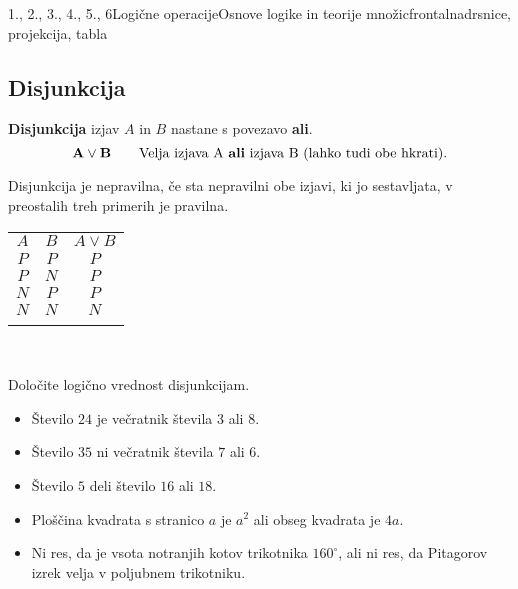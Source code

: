\begin{priprava}{1., 2., 3., 4., 5., 6}{}{Logične operacije}{Osnove logike in teorije množic}{frontalna}{drsnice, projekcija, tabla}
  ~


   \subsection{Disjunkcija}
      \textbf{Disjunkcija} izjav $A$ in $B$ nastane s povezavo \textbf{ali}.
      $$ \mathbf{A\lor B} \quad \quad \textmd{Velja izjava A \textbf{ali} izjava B 
      (lahko tudi obe hkrati).}$$
   
            
              Disjunkcija je nepravilna, če sta nepravilni obe izjavi, ki jo sestavljata,
              v preostalih treh primerih je pravilna.
           

          \begin{table}[H]
              \centering
              \begin{tabular}{||c|c|c||} 
              \hhline{|t:===:t|}
              \rowcolor[rgb]{0.843,0.718,0.718} $A$ & $B$ & $A\lor B$  \\ 
              \hhline{|:===:|}
              $P$ & $P$ & $P$                         \\ 
              \hline
              $P$ & $N$ & $P$                         \\ 
              \hline
              $N$ & $P$ & $P$                         \\ 
              \hline
              $N$ & $N$ & $N$                         \\
              \hhline{|b:===:b|}
              \end{tabular}
          \end{table}



~


   \begin{naloga}
      Določite logično vrednost disjunkcijam.
      \begin{itemize}
          \item Število $24$ je večratnik števila $3$ ali $8$.
          \item Število $35$ ni večratnik števila $7$ ali $6$.
          \item Število $5$ deli število $16$ ali $18$.
          \item Ploščina kvadrata s stranico $a$ je $a^2$ ali obseg kvadrata je $4a$.
          \item Ni res, da je vsota notranjih kotov trikotnika $160^\circ$, ali ni res, 
              da Pitagorov izrek velja v poljubnem trikotniku.
      \end{itemize}
  \end{naloga}


\end{priprava}
